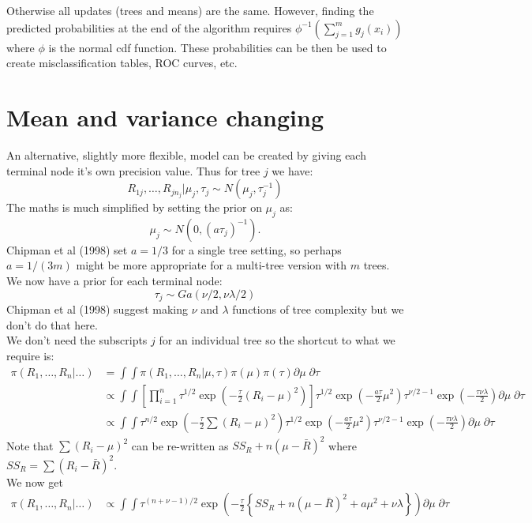 \documentclass{article}
\begin{document}
Otherwise all updates (trees and means) are the same. However, finding the predicted probabilities at the end of the algorithm requires $\phi^{-1}(\sum_{j=1}^m g_j(x_i))$ where $\phi$ is the normal cdf function. These probabilities can be then be used to create misclassification tables, ROC curves, etc.

\section*{Mean and variance changing}

An alternative, slightly more flexible, model can be created by giving each terminal node it's own precision value. Thus for tree $j$ we have:
$$ R_{1j}, \ldots, R_{jn_j} | \mu_j, \tau_j \sim N(\mu_j, \tau_j^{-1})$$
The maths is much simplified by setting the prior on $\mu_j$ as:
$$\mu_j \sim N(0, (a \tau_j)^{-1}).$$
Chipman et al (1998) set $a = 1/3$ for a single tree setting, so perhaps $a = 1/(3m)$ might be more appropriate for a multi-tree version with $m$ trees.\\

We now have a prior for each terminal node:
$$\tau_j \sim Ga(\nu/2, \nu \lambda / 2)$$
Chipman et al (1998) suggest making $\nu$ and $\lambda$ functions of tree complexity but we don't do that here.\\

We don't need the subscripts $j$ for an individual tree so the shortcut to what we require is:
\begin{align*}
\pi(R_1, \ldots, R_n| \ldots ) &= \int \int \pi(R_1, \ldots, R_n| \mu, \tau) \pi(\mu) \pi(\tau) \partial \mu \; \partial \tau \\
&\propto \int \int \left[ \prod_{i=1}^n \tau^{1/2} \exp \left(-\frac{\tau}{2} (R_i - \mu)^2 \right) \right]\tau^{1/2} \exp \left(-\frac{a \tau}{2} \mu^2 \right) \tau^{\nu/2 - 1} \exp \left( - \frac{\tau \nu \lambda} {2} \right) \partial \mu \; \partial \tau \\
&\propto \int \int \tau^{n/2} \exp \left(-\frac{\tau}{2} \sum (R_i - \mu)^2 \right) \tau^{1/2} \exp \left(-\frac{a \tau}{2} \mu^2 \right) \tau^{\nu/2 - 1} \exp \left( - \frac{\tau \nu \lambda} {2} \right) \partial \mu \; \partial \tau 
\end{align*}
Note that $\sum (R_i - \mu)^2$ can be re-written as $SS_{R} + n(\mu - \bar{R})^2$ where $SS_R = \sum (R_i - \bar{R})^2$.\\

We now get
\begin{align*}
\pi(R_1, \ldots, R_n| \ldots ) &\propto \int \int  \tau^{(n+\nu - 1)/2} \exp \left(-\frac{\tau}{2} \left\{ SS_{R} + n(\mu - \bar{R})^2  + a \mu^2 + \nu \lambda \right\} \right) \partial \mu \; \partial \tau
\end{align*}
\end{document}
